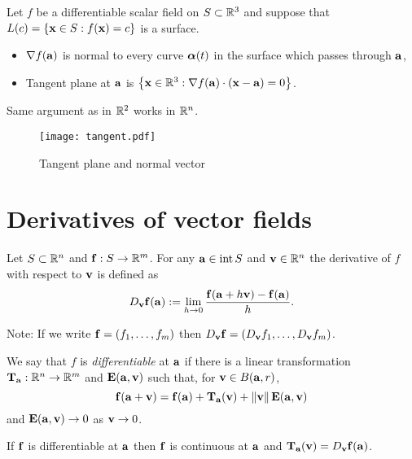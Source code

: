 Let \(f\) be a differentiable scalar field on \(S\subset \bR^3\) and suppose that \(L(c) = \left\{\xx\in S : f(\xx)=c\right\}\) is a surface.

\begin{itemize}
    \item \(\nabla f(\aa)\) is normal to every curve \(\aalpha(t)\) in the surface which passes through \(\aa\),
    \item Tangent plane at \(\aa\) is
          \(\left\{\xx\in\bR^3: \nabla f(\aa) \cdot (\xx-\aa)=0\right\}\).
\end{itemize}

Same argument as in \(\bR^2\) works in \(\bR^n\).


\begin{figure}
    \centering
    \texttt{[image: tangent.pdf]}
    \caption{Tangent plane and normal vector}
\end{figure}


\section{Derivatives of vector fields}

\begin{definition}
    Let \(S\subset \bR^n\) and \(\ff:S\to \bR^m\).
    For any \(\aa \in \operatorname{int}S\) and \(\vv \in \bR^n\) the derivative of \(f\) with respect to \(\vv\) is defined as
    \[
        D_{\vv}\ff(\aa) :=
        \lim_{h\to 0} \frac{\ff(\aa+h \vv) - \ff(\aa)}{h}.
    \]
\end{definition}

Note: If we write \(\ff = (f_1,\ldots,f_m)\) then \(D_{\vv}\ff = (D_{\vv}f_1,\ldots,D_{\vv} f_m)\).


\begin{definition}[differentiable]
    We say that \(f\) is \emph{differentiable} at \(\aa\) if there is a linear transformation \(\mathbf{T}_\aa : \bR^n \to \bR^m\) and \(\mathbf{E}(\aa,\vv)\) such that, for \(\vv\in B(\aa,r)\),
    \[
        \ff(\aa+\vv) = \ff(\aa) + \mathbf{T}_\aa  (\vv )+ \norm{\vv}\mathbf{E}(\aa,\vv)
    \]
    and \(\mathbf{E}(\aa,\vv) \to 0\) as \(\vv \to 0\).
\end{definition}


\begin{theorem}
    If \(\ff\) is differentiable at \(\aa\)
    then \(\ff\) is continuous at \(\aa\)
    and \( \mathbf{T}_{\aa}( \vv) =D_{\vv}\ff(\aa) \).
\end{theorem}

